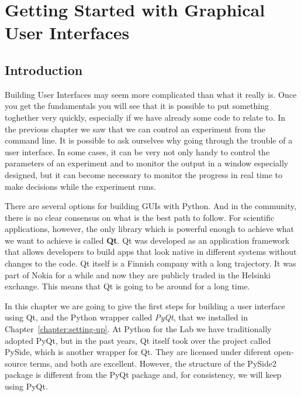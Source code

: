 \chapter{Getting Started with Graphical User Interfaces}\label{chapter:gui}

\section{Introduction}
Building User Interfaces may seem more complicated than what it really is. Once you get the fundamentals you will see that it is possible to put something toghether very quickly, especially if we have already some code to relate to. In the previous chapter we saw that we can control an experiment from the command line. It is possible to ask ourselves why going through the trouble of a user interface. In some cases, it can be very not only handy to control the parameters of an experiment and to monitor the output in a window  especially designed, but it can become necessary to monitor the progress in real time to make decisions while the experiment runs.

There are several options for building GUIs with Python. And in the community, there is no clear consensus on what is the best path to follow. For scientific applications, however, the only library which is powerful enough to achieve what we want to achieve is called \textbf{Qt}. Qt was developed as an application framework that allows developers to build apps that look native in different systems without changes to the code. Qt itself is a Finnish company with a long trajectory. It was part of Nokia for a while and now they are publicly traded in the Helsinki exchange. This means that Qt is going to be around for a long time.

In this chapter we are going to give the first steps for building a user interface using Qt, and the Python wrapper called \emph{PyQt}, that we installed in Chapter~\ref{chapter:setting-up}. At Python for the Lab we have traditionally adopted PyQt, but in the past years, Qt itself took over the project called PySide, which is another wrapper for Qt. They are licensed under diferent open-source terms, and both are excellent. However, the structure of the PySide2 package is different from the PyQt package and, for consistency, we will keep using PyQt.


